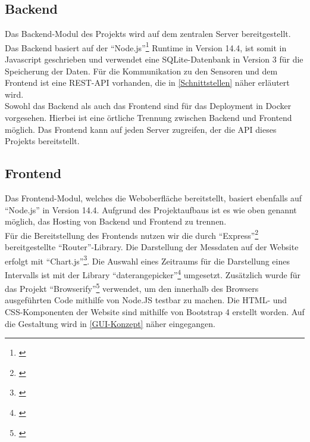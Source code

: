 \subsection{Backend}
Das Backend-Modul des Projekts wird auf dem zentralen Server bereitgestellt.
Das Backend basiert auf der \enquote{Node.js}\footnote{\cite{nodejs}} Runtime in Version 14.4, ist somit in Javascript geschrieben und verwendet eine SQLite-Datenbank in Version 3 für die Speicherung der Daten.
Für die Kommunikation zu den Sensoren und dem Frontend ist eine REST-API vorhanden, die in \autoref{Schnittstellen} näher erläutert wird.\\
Sowohl das Backend als auch das Frontend sind für das Deployment in Docker vorgesehen.
Hierbei ist eine örtliche Trennung zwischen Backend und Frontend möglich. Das Frontend kann auf jeden Server zugreifen, der die API dieses Projekts bereitstellt.

\subsection{Frontend}
Das Frontend-Modul, welches die Weboberfläche bereitstellt, basiert ebenfalls auf \enquote{Node.js} in Version 14.4.
Aufgrund des Projektaufbaus ist es wie oben genannt möglich, das Hosting von Backend und Frontend zu trennen.\\
Für die Bereitstellung des Frontends nutzen wir die durch \enquote{Express}\footnote{\cite{express.2020}} bereitgestellte \enquote{Router}-Library.
Die Darstellung der Messdaten auf der Website erfolgt mit \enquote{Chart.js}\footnote{\cite{chartjs.2020}}.
Die Auswahl eines Zeitraums für die Darstellung eines Intervalls ist mit der Library \enquote{daterangepicker}\footnote{\cite{daterangepicker.2020}} umgesetzt.
Zusätzlich wurde für das Projekt \enquote{Browserify}\footnote{\cite{browserify.2020}} verwendet, um den innerhalb des Browsers ausgeführten Code mithilfe von Node.JS testbar zu machen.
Die HTML- und CSS-Komponenten der Website sind mithilfe von Bootstrap 4 erstellt worden.
Auf die Gestaltung wird in \autoref{GUI-Konzept} näher eingegangen.
